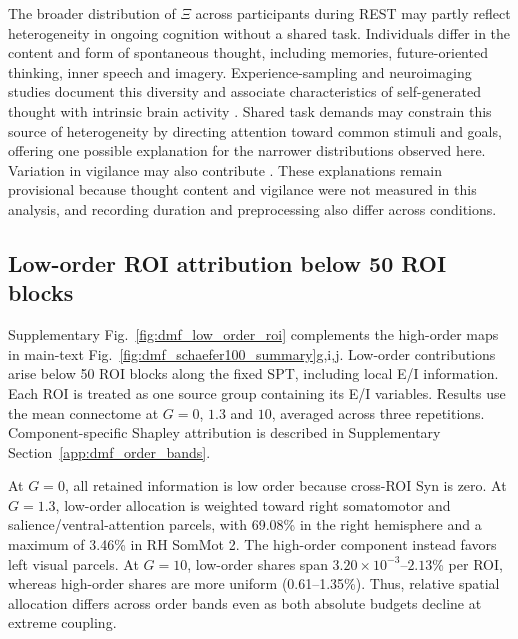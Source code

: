 \documentclass[fleqn,10pt]{wlscirep}
\begin{document}
The broader distribution of $\Xi$ across participants during REST may partly reflect heterogeneity in ongoing cognition without a shared task. Individuals differ in the content and form of spontaneous thought, including memories, future-oriented thinking, inner speech and imagery. Experience-sampling and neuroimaging studies document this diversity and associate characteristics of self-generated thought with intrinsic brain activity \cite{Gorgolewski2014SelfGeneratedThoughts,Hurlburt2015RestingExperience}. Shared task demands may constrain this source of heterogeneity by directing attention toward common stimuli and goals, offering one possible explanation for the narrower distributions observed here. Variation in vigilance may also contribute \cite{Tagliazucchi2014Wakefulness}. These explanations remain provisional because thought content and vigilance were not measured in this analysis, and recording duration and preprocessing also differ across conditions.

\subsection{Low-order ROI attribution below 50 ROI blocks}
\label{app:dmf_low_order_results}


Supplementary Fig.~\ref{fig:dmf_low_order_roi} complements the high-order maps in main-text Fig.~\ref{fig:dmf_schaefer100_summary}g,i,j. Low-order contributions arise below 50 ROI blocks along the fixed SPT, including local E/I information. Each ROI is treated as one source group containing its E/I variables. Results use the mean connectome at $G=0$, $1.3$ and $10$, averaged across three repetitions. Component-specific Shapley attribution is described in Supplementary Section~\ref{app:dmf_order_bands}.

At $G=0$, all retained information is low order because cross-ROI Syn is zero. At $G=1.3$, low-order allocation is weighted toward right somatomotor and salience/ventral-attention parcels, with 69.08\% in the right hemisphere and a maximum of 3.46\% in RH SomMot 2. The high-order component instead favors left visual parcels. At $G=10$, low-order shares span $3.20\times10^{-3}$--$2.13$\% per ROI, whereas high-order shares are more uniform (0.61--1.35\%). Thus, relative spatial allocation differs across order bands even as both absolute budgets decline at extreme coupling.
\end{document}
